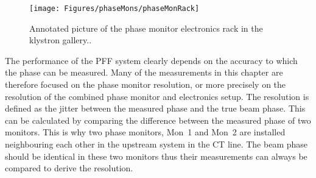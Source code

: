 


\begin{figure}
  \centering
  \texttt{[image: Figures/phaseMons/phaseMonRack]}
  \caption{Annotated picture of the phase monitor electronics rack in the klystron gallery..}
  \label{f:phaseMonRack}
\end{figure}



The performance of the PFF system clearly depends on the accuracy to which the phase can be measured. Many of the measurements in this chapter are therefore focused on the phase monitor resolution, or more precisely on the resolution of the combined phase monitor and electronics setup. The resolution is defined as the jitter between the measured phase and the true beam phase. This can be calculated by comparing the difference between the measured phase of two monitors. This is why two phase monitors, Mon~1 and Mon~2 are installed neighbouring each other in the upstream system in the CT line. The beam phase should be identical in these two monitors thus their measurements can always be compared to derive the resolution.

